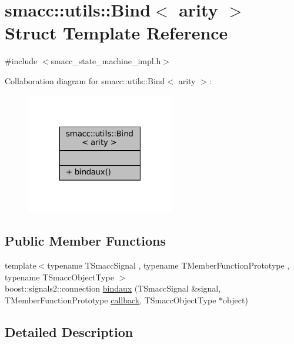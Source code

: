 \hypertarget{structsmacc_1_1utils_1_1Bind}{}\section{smacc\+:\+:utils\+:\+:Bind$<$ arity $>$ Struct Template Reference}
\label{structsmacc_1_1utils_1_1Bind}


{\ttfamily \#include $<$smacc\+\_\+state\+\_\+machine\+\_\+impl.\+h$>$}



Collaboration diagram for smacc\+:\+:utils\+:\+:Bind$<$ arity $>$\+:
\nopagebreak
\begin{figure}[H]
\begin{center}
\leavevmode
\includegraphics[width=183pt]{structsmacc_1_1utils_1_1Bind__coll__graph}
\end{center}
\end{figure}
\subsection*{Public Member Functions}
\begin{DoxyCompactItemize}
\item 
{\footnotesize template$<$typename T\+Smacc\+Signal , typename T\+Member\+Function\+Prototype , typename T\+Smacc\+Object\+Type $>$ }\\boost\+::signals2\+::connection \hyperlink{structsmacc_1_1utils_1_1Bind_aa0f4ba76fbd5fdb865df51b61d4269f3}{bindaux} (T\+Smacc\+Signal \&signal, T\+Member\+Function\+Prototype \hyperlink{3_2servers_2opencv__perception__node_2opencv__perception__node_8cpp_a050e697bd654facce10ea3f6549669b3}{callback}, T\+Smacc\+Object\+Type $\ast$object)
\end{DoxyCompactItemize}


\subsection{Detailed Description}
